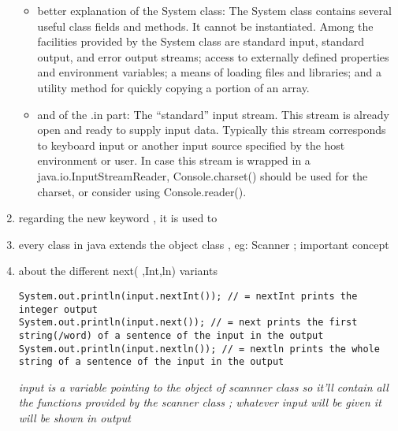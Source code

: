 \documentclass[11pt]{article}
\begin{document}
\begin{enumerate}
\begin{itemize}
\item better explanation of the System class: The System class contains several useful class fields and methods. It cannot be instantiated. Among the facilities provided by the System class are standard input, standard output, and error output streams; access to externally defined properties and environment variables; a means of loading files and libraries; and a utility method for quickly copying a portion of an array.
\item and of the .in part: The ``standard'' input stream. This stream is already open and ready to supply input data. Typically this stream corresponds to keyboard input or another input source specified by the host environment or user. In case this stream is wrapped in a java.io.InputStreamReader, Console.charset() should be used for the charset, or consider using Console.reader().
\end{itemize}

\item regarding the new keyword , it is used to

\item every class in java extends the object class , eg: Scanner ; important concept
\item about the different next( ,Int,ln) variants
\begin{verbatim}
System.out.println(input.nextInt()); // = nextInt prints the integer output
System.out.println(input.next()); // = next prints the first string(/word) of a sentence of the input in the output
System.out.println(input.nextln()); // = nextln prints the whole string of a sentence of the input in the output
\end{verbatim}

\emph{input is a variable pointing to the object of scannner class so it'll contain all the functions provided by the scanner class ; whatever input will be given it will be shown in output}
\end{enumerate}
\end{document}

